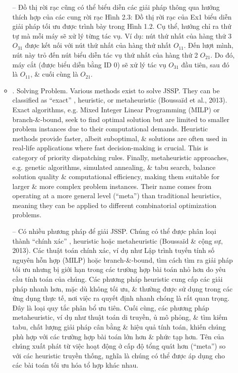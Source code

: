 \documentclass{article}
\begin{document}
\begin{itemize}
\begin{itemize}
        -- Đồ thị rời rạc cũng có thể biểu diễn các giải pháp thông qua hướng thích hợp của các cung rời rạc {\sf Hình 2.3: Đồ thị rời rạc của Ex1 biểu diễn giải pháp tối ưu được trình bày trong Hình 1.2}. Cụ thể, hướng chỉ ra thứ tự mà mỗi máy sẽ xử lý từng tác vụ. Ví dụ: nút thứ nhất của hàng thứ 3 $O_{31}$ được kết nối với nút thứ nhất của hàng thứ nhất $O_{11}$. Đến lượt mình, nút này trỏ đến nút biểu diễn tác vụ thứ nhất của hàng thứ 2 $O_{21}$. Do đó, máy cắt (được biểu diễn bằng ID 0) sẽ xử lý tác vụ $O_{31}$ đầu tiên, sau đó là $O_{11}$, \& cuối cùng là $O_{21}$.
        \item {. Solving Problem.} Various methods exist to solve JSSP. They can be classified as ``exact'' \cite{Korte_Vygen2018}, heuristic, or metaheuristic (Boussaïd et al., 2013). Exact algorithms, e.g. Mixed Integer Linear Programming (MILP) or branch-\&-bound, seek to find optimal solution but are limited to smaller problem instances due to their computational demands. Heuristic methods provide faster, albeit suboptimal, \& solutions are often used in real-life applications where fast decision-making is crucial. This is category of priority dispatching rules. Finally, metaheuristic approaches, e.g. genetic algorithms, simulated annealing, \& tabu search, balance solution quality \& computational efficiency, making them suitable for larger \& more complex problem instances. Their name comes from operating at a more general level (``meta'') than traditional heuristics, meaning they can be applied to different combinatorial optimization problems.

        -- Có nhiều phương pháp để giải JSSP. Chúng có thể được phân loại thành ``chính xác'' \cite{Korte_Vygen2018}, heuristic hoặc metaheuristic (Boussaïd \& cộng sự, 2013). Các thuật toán chính xác, ví dụ như Lập trình tuyến tính số nguyên hỗn hợp (MILP) hoặc branch-\&-bound, tìm cách tìm ra giải pháp tối ưu nhưng bị giới hạn trong các trường hợp bài toán nhỏ hơn do yêu cầu tính toán của chúng. Các phương pháp heuristic cung cấp các giải pháp nhanh hơn, mặc dù không tối ưu, \& thường được sử dụng trong các ứng dụng thực tế, nơi việc ra quyết định nhanh chóng là rất quan trọng. Đây là loại quy tắc phân bổ ưu tiên. Cuối cùng, các phương pháp metaheuristic, ví dụ như thuật toán di truyền, ủ mô phỏng, \& tìm kiếm tabu, chất lượng giải pháp cân bằng \& hiệu quả tính toán, khiến chúng phù hợp với các trường hợp bài toán lớn hơn \& phức tạp hơn. Tên của chúng xuất phát từ việc hoạt động ở cấp độ tổng quát hơn (``meta'') so với các heuristic truyền thống, nghĩa là chúng có thể được áp dụng cho các bài toán tối ưu hóa tổ hợp khác nhau.


\end{itemize}
\end{itemize}
\end{document}
